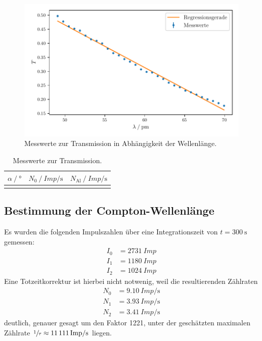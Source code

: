 \begin{figure}
    \centering
    \includegraphics[width=\textwidth]{build/plt/transmission.pdf}
    \caption{Messwerte zur Transmission in Abhängigkeit der Wellenlänge.}
    \label{fig:plt_transmission}
\end{figure}

\clearpage
\begin{table}
  \centering
  \caption{Messwerte zur Transmission.}
  \label{tab:mess_transmission}
  \begin{tabular}{S S S}
  \toprule
  {$\alpha \mathbin{/} \si{\degree}$} &
  {$N_0 \mathbin{/} \si{{Imp}\per\second}$} &
  {$N_\text{Al} \mathbin{/} \si{{Imp}\per\second}$} \\
  \midrule
  \bottomrule
  \end{tabular}
\end{table}


\FloatBarrier
\subsection{Bestimmung der Compton-Wellenlänge}
\label{sec:auswertung:compton_wellenlaenge}

Es wurden die folgenden Impulszahlen über eine Integrationszeit von $t = \SI{300}{\second}$ gemessen:
\begin{align*}
  I_0 &= \SI{2731}{{Imp}} \tag {ohne Al-Absorper} \\
  I_1 &= \SI{1180}{{Imp}} \tag {mit Al-Absorber zwischen Röntgenröhre und Streuer} \\
  I_2 &= \SI{1024}{{Imp}} \tag {mit Al-Absorber zwischen Streuer und Geiger-Müller-Zählrohr}
\end{align*}
Eine Totzeitkorrektur ist hierbei nicht notwenig,
weil die resultierenden Zählraten
\begin{align*}
  N_0 &= \SI{9.10}{{Imp}\per\second} \\
  N_1 &= \SI{3.93}{{Imp}\per\second} \\
  N_2 &= \SI{3.41}{{Imp}\per\second}
\end{align*}
deutlich, genauer gesagt um den Faktor 1221,
unter der geschätzten maximalen Zählrate $\sfrac{1}{\tau} \approx \SI{11111}{{Imp}\per\second}$ liegen.

